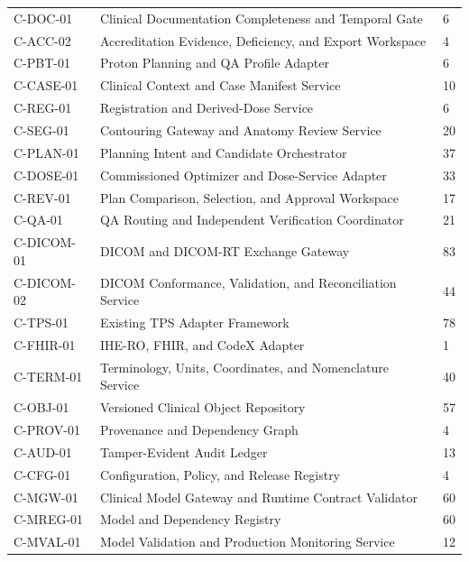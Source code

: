 \documentclass[11pt,letterpaper]{article}
\begin{document}
\begin{small}
\begin{longtable}{@{}L{0.16\textwidth}L{0.58\textwidth}L{0.18\textwidth}@{}}
\addlinespace[2pt]
C-DOC-01 & Clinical Documentation Completeness and Temporal Gate & 6 \\
\addlinespace[2pt]
C-ACC-02 & Accreditation Evidence, Deficiency, and Export Workspace & 4 \\
\addlinespace[2pt]
C-PBT-01 & Proton Planning and QA Profile Adapter & 6 \\
\addlinespace[2pt]
C-CASE-01 & Clinical Context and Case Manifest Service & 10 \\
\addlinespace[2pt]
C-REG-01 & Registration and Derived-Dose Service & 6 \\
\addlinespace[2pt]
C-SEG-01 & Contouring Gateway and Anatomy Review Service & 20 \\
\addlinespace[2pt]
C-PLAN-01 & Planning Intent and Candidate Orchestrator & 37 \\
\addlinespace[2pt]
C-DOSE-01 & Commissioned Optimizer and Dose-Service Adapter & 33 \\
\addlinespace[2pt]
C-REV-01 & Plan Comparison, Selection, and Approval Workspace & 17 \\
\addlinespace[2pt]
C-QA-01 & QA Routing and Independent Verification Coordinator & 21 \\
\addlinespace[2pt]
C-DICOM-01 & DICOM and DICOM-RT Exchange Gateway & 83 \\
\addlinespace[2pt]
C-DICOM-02 & DICOM Conformance, Validation, and Reconciliation Service & 44 \\
\addlinespace[2pt]
C-TPS-01 & Existing TPS Adapter Framework & 78 \\
\addlinespace[2pt]
C-FHIR-01 & IHE-RO, FHIR, and CodeX Adapter & 1 \\
\addlinespace[2pt]
C-TERM-01 & Terminology, Units, Coordinates, and Nomenclature Service & 40 \\
\addlinespace[2pt]
C-OBJ-01 & Versioned Clinical Object Repository & 57 \\
\addlinespace[2pt]
C-PROV-01 & Provenance and Dependency Graph & 4 \\
\addlinespace[2pt]
C-AUD-01 & Tamper-Evident Audit Ledger & 13 \\
\addlinespace[2pt]
C-CFG-01 & Configuration, Policy, and Release Registry & 4 \\
\addlinespace[2pt]
C-MGW-01 & Clinical Model Gateway and Runtime Contract Validator & 60 \\
\addlinespace[2pt]
C-MREG-01 & Model and Dependency Registry & 60 \\
\addlinespace[2pt]
C-MVAL-01 & Model Validation and Production Monitoring Service & 12 \\

\end{longtable}
\end{small}
\end{document}
